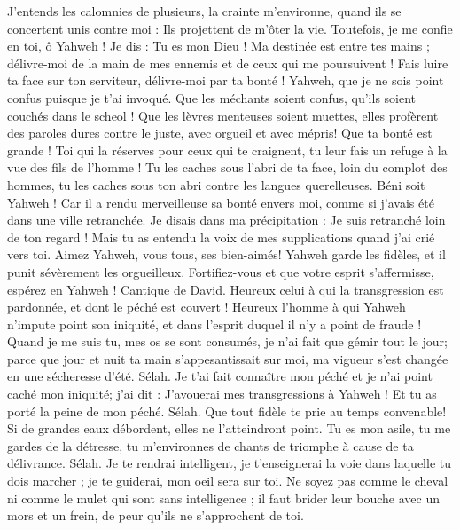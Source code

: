 \begin{multicols}{2}
J'entends les calomnies de plusieurs, la crainte m'environne, quand ils se concertent unis contre moi : Ils projettent de m'ôter la vie.
Toutefois, je me confie en toi, ô Yahweh ! Je dis : Tu es mon Dieu !
Ma destinée est entre tes mains ; délivre-moi de la main de mes ennemis et de ceux qui me poursuivent !
Fais luire ta face sur ton serviteur, délivre-moi par ta bonté !
Yahweh, que je ne sois point confus puisque je t'ai invoqué. Que les méchants soient confus, qu'ils soient couchés dans le scheol !
Que les lèvres menteuses soient muettes, elles profèrent des paroles dures contre le juste, avec orgueil et avec mépris!
Que ta bonté est grande ! Toi qui la réserves pour ceux qui te craignent, tu leur fais un refuge à la vue des fils de l'homme !
Tu les caches sous l'abri de ta face, loin du complot des hommes, tu les caches sous ton abri contre les langues querelleuses.
Béni soit Yahweh ! Car il a rendu merveilleuse sa bonté envers moi, comme si j'avais été dans une ville retranchée.
Je disais dans ma précipitation : Je suis retranché loin de ton regard ! Mais tu as entendu la voix de mes supplications quand j'ai crié vers toi.
Aimez Yahweh, vous tous, ses bien-aimés! Yahweh garde les fidèles, et il punit sévèrement les orgueilleux.
Fortifiez-vous et que votre esprit s'affermisse, espérez en Yahweh !
\VerseOne{}Cantique de David. Heureux celui à qui la transgression est pardonnée, et dont le péché est couvert !
Heureux l'homme à qui Yahweh n'impute point son iniquité, et dans l'esprit duquel il n'y a point de fraude !
Quand je me suis tu, mes os se sont consumés, je n'ai fait que gémir tout le jour;
parce que jour et nuit ta main s'appesantissait sur moi, ma vigueur s'est changée en une sécheresse d'été. Sélah.
Je t'ai fait connaître mon péché et je n'ai point caché mon iniquité; j'ai dit : J'avouerai mes transgressions à Yahweh ! Et tu as porté la peine de mon péché. Sélah.
Que tout fidèle te prie au temps convenable! Si de grandes eaux débordent, elles ne l'atteindront point.
Tu es mon asile, tu me gardes de la détresse, tu m'environnes de chants de triomphe à cause de ta délivrance. Sélah.
Je te rendrai intelligent, je t'enseignerai la voie dans laquelle tu dois marcher ; je te guiderai, mon oeil sera sur toi.
Ne soyez pas comme le cheval ni comme le mulet qui sont sans intelligence ; il faut brider leur bouche avec un mors et un frein, de peur qu'ils ne s'approchent de toi.

\end{multicols}
